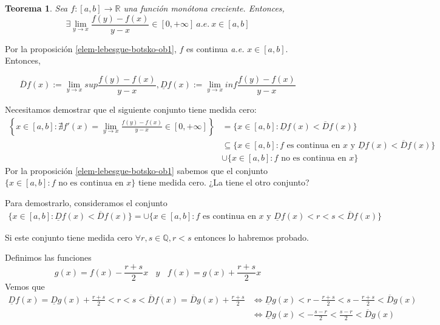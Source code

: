 \documentclass[11pt, a4paper]{article}
\makeatletter
\newif\IfInSansMode
\let\oldsf\sffamily
\renewcommand*{\sffamily}{\oldsf\mathversion{sans}\InSansModetrue}
\let\oldnorm\normalfont
\renewcommand*{\normalfont}{\oldnorm\InSansModefalse\mathversion{normal}}
\newcommand{\R}{\mathbb{R}} \newcommand{\N}{\mathbb{N}}
\renewenvironment{proof}[1][\proofname] {\par\pushQED{\qed}\normalfont\topsep6\p@\@plus6\p@\relax\trivlist\item[\hskip\labelsep\itshape\sffamily#1\@addpunct{.}]\ignorespaces}{\popQED\endtrivlist\@endpefalse}
\theoremstyle{theorem-style}
\newtheorem{nth}{Teorema}[section]
\theoremstyle{definition-style}
\theoremstyle{remark-style}
\theoremstyle{example-style}
\makeatother
\begin{document}
\begin{nth}
    \label{elem-lebesgue-botsko-th1}
    Sea $f : [a, b] \rightarrow \R$ una función monótona creciente. Entonces, $$\exists \lim_{y \to x} \frac{f(y) - f(x)}{y - x} \in [0, +\infty] \ a.e. \ x \in [a, b]$$
\end{nth}

\begin{proof}
    Por la proposición \ref{elem-lebesgue-botsko-ob1}, $f$ es continua \textit{a.e.} $x \in [a, b]$. Entonces,

    $$\overline{D} f (x) := \lim_{y \to x} sup \frac{f(y) - f(x)}{y -x}, \underline{D} f (x) := \lim_{y \to x} inf \frac{f(y) - f(x)}{y -x}$$

    Necesitamos demostrar que el siguiente conjunto tiene medida cero: \begin{align*} 
        \left\{ x \in [a, b] : \nexists f'(x) = \lim_{y \to x} \frac{f(y) - f(x)}{y - x} \in [0, +\infty] \right\} &= \{ x \in [a, b] : \underline{D} f(x) < \overline{D} f(x) \} \\
            & \subseteq \{ x \in [a, b] : f \text{ es continua en } x \text{ y } \underline{D} f(x) < \overline{D} f(x) \} \\
            & \cup \{ x \in [a, b] : f \text{ no es continua en } x \}
    \end{align*}
    Por la proposición \ref{elem-lebesgue-botsko-ob1} sabemos que el conjunto $\{ x \in [a, b] : f \text{ no es continua en } x \}$ tiene medida cero. ¿La tiene el otro conjunto?

    Para demostrarlo, consideramos el conjunto \begin{align*}
        \label{}
        \{ x \in [a, b] : \underline{D} f(x) < \overline{D} f(x) \} = \cup \{ x \in [a, b] : f \text{ es continua en } x \text{ y } \underline{D} f(x) < r < s < \overline{D} f(x) \}
    \end{align*}

    Si este conjunto tiene medida cero $\forall r, s \in \mathbb Q, r < s$ entonces lo habremos probado.

    Definimos las funciones $$g(x) = f(x) - \frac{r+s}{2}x \ \ \ \ y \ \ \ \ f(x) = g(x) + \frac{r+s}{2}x$$
    Vemos que \begin{align*}
        \label{}
        \underline{D} f(x) = \underline{D} g (x) + \frac{r+s}{2} < r < s < \overline{D} f(x) = \overline{D} g(x) + \frac{r+s}{2} &\Leftrightarrow \underline{D} g(x) < r - \frac{r+s}{2} < s - \frac{r+s}{2} < \overline{D} g(x) \\
                                     &\Leftrightarrow \underline{D} g (x) < - \frac{s-r}{2} < \frac{s-r}{2} < \overline{D} g(x)
    \end{align*}


\end{proof}
\end{document}
